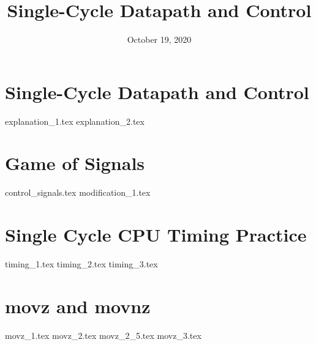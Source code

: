 \documentclass[11pt]{exam}
\title{Single-Cycle Datapath and Control}
\date{October 19, 2020}
\begin{document}
\maketitle

\section{Single-Cycle Datapath and Control}
\begin{questions}
{explanation_1.tex}
{explanation_2.tex}
\end{questions}
\newpage

\section{Game of Signals}
\begin{questions}
{control_signals.tex}
{modification_1.tex}
\end{questions}
\newpage

\section{Single Cycle CPU Timing Practice}
\begin{questions}
{timing_1.tex}
{timing_2.tex}
{timing_3.tex}
\end{questions}
\newpage

\section{movz and movnz}
\begin{questions}
{movz_1.tex}
{movz_2.tex}
{movz_2_5.tex}
{movz_3.tex}
\end{questions}
\newpage
\end{document}
